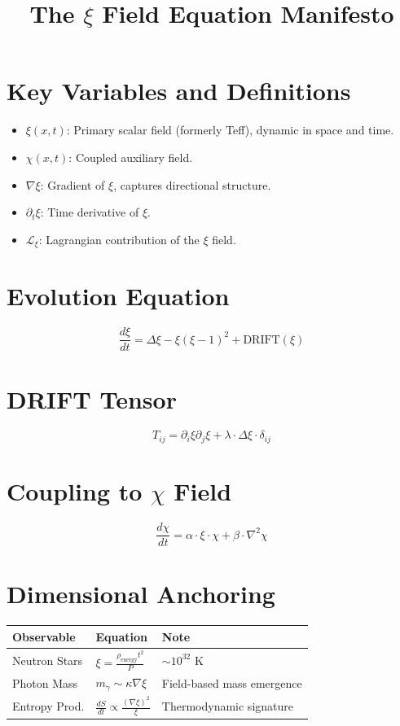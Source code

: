 \documentclass{article}
\title{The $\xi$ Field Equation Manifesto}
\author{}
\date{}
\begin{document}
\maketitle

\section*{Key Variables and Definitions}

\begin{itemize}
  \item $\xi(x, t)$: Primary scalar field (formerly Teff), dynamic in space and time.
  \item $\chi(x, t)$: Coupled auxiliary field.
  \item $\nabla \xi$: Gradient of $\xi$, captures directional structure.
  \item $\partial_t \xi$: Time derivative of $\xi$.
  \item $\mathcal{L}_\xi$: Lagrangian contribution of the $\xi$ field.
\end{itemize}

\section*{Evolution Equation}

\[
\frac{d\xi}{dt} = \Delta \xi - \xi(\xi - 1)^2 + \text{DRIFT}(\xi)
\]

\section*{DRIFT Tensor}

\[
T_{ij} = \partial_i \xi \partial_j \xi + \lambda \cdot \Delta \xi \cdot \delta_{ij}
\]

\section*{Coupling to $\chi$ Field}

\[
\frac{d\chi}{dt} = \alpha \cdot \xi \cdot \chi + \beta \cdot \nabla^2 \chi
\]

\section*{Dimensional Anchoring}

\begin{tabular}{|l|l|l|}
\hline
\textbf{Observable} & \textbf{Equation} & \textbf{Note} \\
\hline
Neutron Stars & $\xi = \frac{\rho_{\text{energy}} t^2}{P}$ & $\sim 10^{32}$ K \\
Photon Mass & $m_\gamma \sim \kappa \nabla \xi$ & Field-based mass emergence \\
Entropy Prod. & $\frac{dS}{dt} \propto \frac{(\nabla \xi)^2}{\xi}$ & Thermodynamic signature \\
\hline
\end{tabular}
\end{document}
